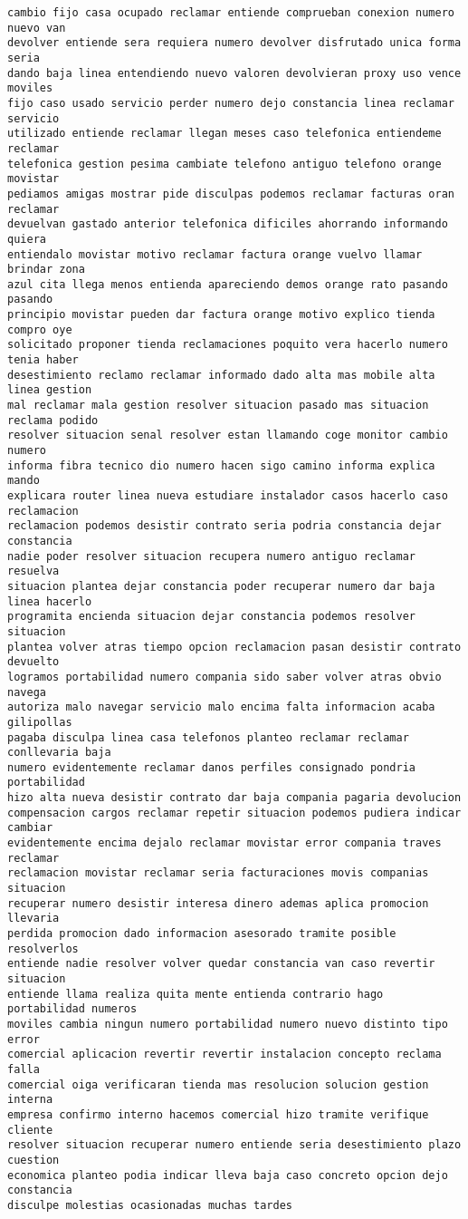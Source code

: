 \begin{Verbatim}[commandchars=\\\{\}]
cambio fijo casa ocupado reclamar entiende comprueban conexion numero nuevo van
devolver entiende sera requiera numero devolver disfrutado unica forma seria
dando baja linea entendiendo nuevo valoren devolvieran proxy uso vence moviles
fijo caso usado servicio perder numero dejo constancia linea reclamar servicio
utilizado entiende reclamar llegan meses caso telefonica entiendeme reclamar
telefonica gestion pesima cambiate telefono antiguo telefono orange movistar
pediamos amigas mostrar pide disculpas podemos reclamar facturas oran reclamar
devuelvan gastado anterior telefonica dificiles ahorrando informando quiera
entiendalo movistar motivo reclamar factura orange vuelvo llamar brindar zona
azul cita llega menos entienda apareciendo demos orange rato pasando pasando
principio movistar pueden dar factura orange motivo explico tienda compro oye
solicitado proponer tienda reclamaciones poquito vera hacerlo numero tenia haber
desestimiento reclamo reclamar informado dado alta mas mobile alta linea gestion
mal reclamar mala gestion resolver situacion pasado mas situacion reclama podido
resolver situacion senal resolver estan llamando coge monitor cambio numero
informa fibra tecnico dio numero hacen sigo camino informa explica mando
explicara router linea nueva estudiare instalador casos hacerlo caso reclamacion
reclamacion podemos desistir contrato seria podria constancia dejar constancia
nadie poder resolver situacion recupera numero antiguo reclamar resuelva
situacion plantea dejar constancia poder recuperar numero dar baja linea hacerlo
programita encienda situacion dejar constancia podemos resolver situacion
plantea volver atras tiempo opcion reclamacion pasan desistir contrato devuelto
logramos portabilidad numero compania sido saber volver atras obvio navega
autoriza malo navegar servicio malo encima falta informacion acaba gilipollas
pagaba disculpa linea casa telefonos planteo reclamar reclamar conllevaria baja
numero evidentemente reclamar danos perfiles consignado pondria portabilidad
hizo alta nueva desistir contrato dar baja compania pagaria devolucion
compensacion cargos reclamar repetir situacion podemos pudiera indicar cambiar
evidentemente encima dejalo reclamar movistar error compania traves reclamar
reclamacion movistar reclamar seria facturaciones movis companias situacion
recuperar numero desistir interesa dinero ademas aplica promocion llevaria
perdida promocion dado informacion asesorado tramite posible resolverlos
entiende nadie resolver volver quedar constancia van caso revertir situacion
entiende llama realiza quita mente entienda contrario hago portabilidad numeros
moviles cambia ningun numero portabilidad numero nuevo distinto tipo error
comercial aplicacion revertir revertir instalacion concepto reclama falla
comercial oiga verificaran tienda mas resolucion solucion gestion interna
empresa confirmo interno hacemos comercial hizo tramite verifique cliente
resolver situacion recuperar numero entiende seria desestimiento plazo cuestion
economica planteo podia indicar lleva baja caso concreto opcion dejo constancia
disculpe molestias ocasionadas muchas tardes



\end{Verbatim}

